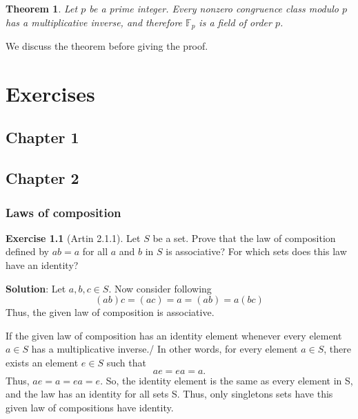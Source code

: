 \documentclass[
]{book}
\newtheorem{theorem}{Theorem}[chapter]
\theoremstyle{definition}
\theoremstyle{definition}
\theoremstyle{definition}
\newtheorem{exercise}{Exercise}[chapter]
\theoremstyle{definition}
\theoremstyle{remark}
\begin{document}
\begin{theorem}
\protect\hypertarget{thm:unnamed-chunk-77}{}\label{thm:unnamed-chunk-77}Let \(p\) be a prime integer. Every nonzero congruence class modulo \(p\) has a multiplicative inverse, and therefore \(\mathbb{F}_p\) is a field of order \(p\).
\end{theorem}

We discuss the theorem before giving the proof.

\hypertarget{exercises}{%
\chapter{Exercises}\label{exercises}}

\hypertarget{chapter-1}{%
\section{Chapter 1}\label{chapter-1}}

\hypertarget{chapter-2}{%
\section{Chapter 2}\label{chapter-2}}

\hypertarget{laws-of-composition}{%
\subsection{Laws of composition}\label{laws-of-composition}}

\begin{exercise}[Artin 2.1.1]
\protect\hypertarget{exr:unnamed-chunk-78}{}\label{exr:unnamed-chunk-78}Let \(S\) be a set. Prove that the law of composition defined by \(ab = a\) for all \(a\) and \(b\) in \(S\) is associative? For which sets does this law have an identity?
\end{exercise}

\textbf{Solution}: Let \(a,b,c\in S\).
Now consider following
\[(ab)c=(ac)=a=(ab)=a(bc)\]
Thus, the given law of composition is associative.

If the given law of composition has an identity element whenever every element \(a\in S\) has a multiplicative inverse./
In other words, for every element \(a\in S\), there exists an element \(e \in S\) such that \[ae = ea = a.\]
Thus, \(ae=a=ea=e\). So, the identity element is the same as every element in S, and the law has an identity for all sets S. Thus, only singletons sets have this given law of compositions have identity.
\end{document}
